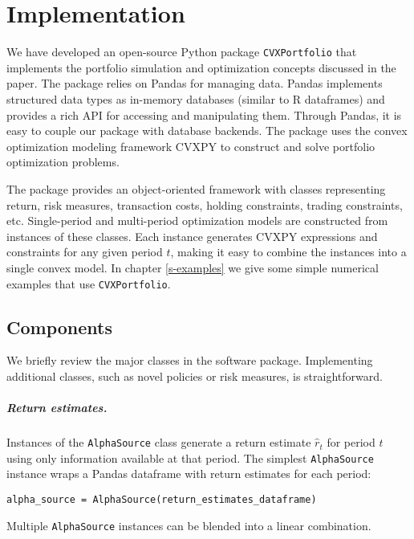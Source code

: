 \documentclass[openany]{now}
\begin{document}
\chapter{Implementation}
We have developed an open-source Python package
\verb|CVXPortfolio| \cite{cvxportfolio}
that implements the portfolio simulation and optimization concepts discussed in the paper.
The package relies on Pandas \cite{mckinney2012python} for managing data.
Pandas implements structured data types as in-memory databases
(similar to R dataframes) and provides a rich
API for accessing and manipulating them.
Through Pandas, it is easy to couple our package with database backends.
The package uses the convex optimization modeling framework CVXPY \cite{cvxpy}
to construct and solve portfolio optimization problems.

The package provides an object-oriented framework with classes representing
return, risk measures, transaction costs, holding constraints,
trading constraints, etc.
Single-period and multi-period optimization models are constructed
from instances of these classes.
Each instance generates CVXPY expressions and constraints for any given period $t$,
making it easy to combine the instances into a single convex model.
In chapter \ref{s-examples}
we give some simple numerical examples that use \verb|CVXPortfolio|.

\section{Components}
We briefly review the major classes in the software package.
Implementing additional classes, such as novel policies or risk measures, is straightforward.

\paragraph{Return estimates.} Instances of the \verb|AlphaSource| class generate a return
estimate $\hat{r}_{t}$ for period $t$ using only information available at that period.
The simplest \verb|AlphaSource| instance wraps a Pandas dataframe with return estimates
for each period:
\begin{verbatim}
alpha_source = AlphaSource(return_estimates_dataframe)
\end{verbatim}
Multiple \verb|AlphaSource| instances can be blended into a linear combination.
\end{document}
